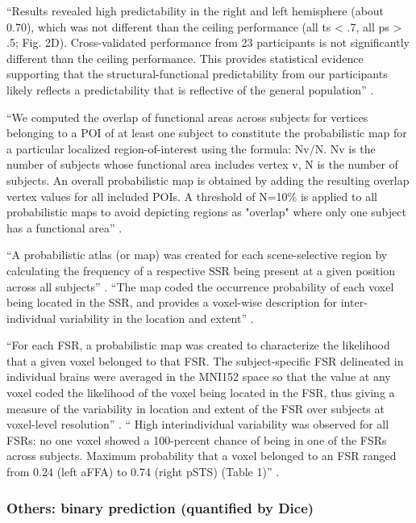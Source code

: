 %
``Results revealed high predictability in the right and left hemisphere (about
0.70), which was not different than the ceiling performance (all ts < .7, all ps
> .5; Fig. 2D).
%
Cross-validated performance from 23 participants is not significantly different
than the ceiling performance.
%
This provides statistical evidence supporting that the structural-functional
predictability from our participants likely reflects a predictability that is
reflective of the general population'' \citep{weiner2018defining}.

%
``We computed the overlap of functional areas across subjects for vertices
belonging to a POI of at least one subject to constitute the probabilistic map
for a particular localized region-of-interest using the formula: Nv/N.
%
Nv is the number of subjects whose functional area includes vertex v,
%
N is the number of subjects.
%
An overall probabilistic map is obtained by adding the resulting overlap vertex
values for all included POIs.
%
A threshold of N=10\% is applied to all probabilistic maps to avoid depicting
regions as "overlap" where only one subject has a functional area''
\citep{frost2012measuring}.


%
``A probabilistic atlas (or map) was created for each scene-selective region by
calculating the frequency of a respective SSR being present at a given position
across all subjects'' \citep{zhen2017quantifying}.
%
``The map coded the occurrence probability of each voxel being located in the
SSR, and provides a voxel-wise description for inter-individual variability in
the location and extent'' \citep{zhen2017quantifying}.


%
``For each FSR, a probabilistic map was created to characterize the likelihood
that a given voxel belonged to that FSR.
%
The subject-specific FSR delineated in individual brains were averaged in the
MNI152 space so that the value at any voxel coded the likelihood of the voxel
being located in the FSR, thus giving a measure of the variability in location
and extent of the FSR over subjects at voxel-level resolution''
\citep{zhen2015quantifying}.
%
``
High interindividual variability was observed for all FSRs: no one voxel showed
a 100-percent chance of being in one of the FSRs across subjects.
%
Maximum probability that a voxel belonged to an FSR ranged from 0.24 (left aFFA)
to 0.74 (right pSTS) (Table 1)'' \citet{zhen2015quantifying}.



\subsubsection{Others: binary prediction (quantified by Dice)}

